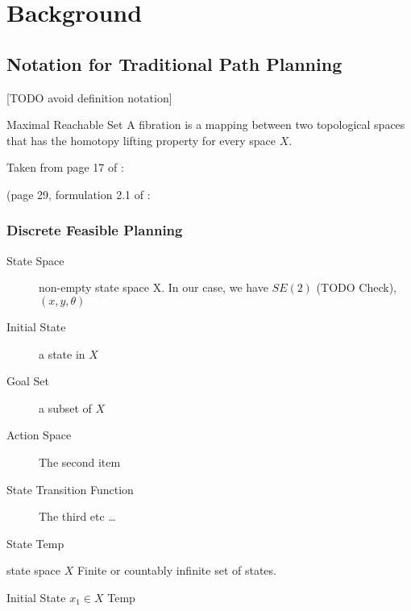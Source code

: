 \chapter{Background}


\section{Notation for Traditional Path Planning}

[TODO avoid definition notation]
\theoremstyle{definition}
\begin{definition}{Maximal Reachable Set}
A fibration is a mapping between two topological spaces that has the homotopy lifting property for every space $X$.
\end{definition}

Taken from page 17 of \cite{lavalle2006planning}:


(page 29, formulation 2.1 of \cite{lavalle2006planning}:
\subsection{Discrete Feasible Planning}
\begin{description}
  \item[State Space] non-empty state space X. In our case, we have
  $SE(2)$ (TODO Check), $(x,y,\theta)$
  \item[Initial State] a state in $X$
  \item[Goal Set] a subset of $X$
  \item[Action Space] The second item
  \item[State Transition Function] The third etc \ldots
\end{description}

\begin{definition}{State}
Temp
\end{definition}

\begin{definition}{state space $X$}
Finite or countably infinite set of states.
\end{definition}

\begin{definition}{Initial State $x_1 \in X$}
Temp
\end{definition}

